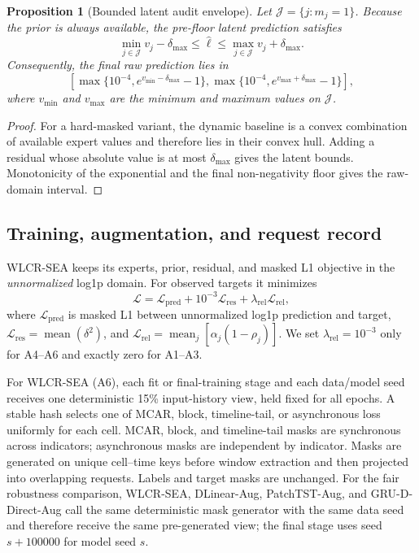 \documentclass[10pt,conference,letterpaper]{IEEEtran}
\newtheorem{proposition}{Proposition}
\newcommand{\method}{WLCR-SEA}
\begin{document}
\begin{proposition}[Bounded latent audit envelope]
Let $\mathcal J=\{j:m_j=1\}$. Because the prior is always available, the pre-floor latent prediction satisfies
\begin{equation}
\min_{j\in\mathcal J}v_j-\delta_{\max}
\leq \widehat\ell \leq
\max_{j\in\mathcal J}v_j+\delta_{\max}.
\end{equation}
Consequently, the final raw prediction lies in
\begin{equation}
\left[\max\{10^{-4},e^{v_{\min}-\delta_{\max}}-1\},
\max\{10^{-4},e^{v_{\max}+\delta_{\max}}-1\}\right],
\end{equation}
where $v_{\min}$ and $v_{\max}$ are the minimum and maximum values on $\mathcal J$.
\end{proposition}
\begin{proof}
For a hard-masked variant, the dynamic baseline is a convex combination of available expert values and therefore lies in their convex hull. Adding a residual whose absolute value is at most $\delta_{\max}$ gives the latent bounds. Monotonicity of the exponential and the final non-negativity floor gives the raw-domain interval.
\end{proof}

\subsection{Training, augmentation, and request record}
WLCR-SEA keeps its experts, prior, residual, and masked L1 objective in the \emph{unnormalized} log1p domain. For observed targets it minimizes
\begin{equation}
\mathcal L=\mathcal L_{\mathrm{pred}}
+10^{-3}\mathcal L_{\mathrm{res}}
+\lambda_{\mathrm{rel}}\mathcal L_{\mathrm{rel}},
\end{equation}
where $\mathcal L_{\mathrm{pred}}$ is masked L1 between unnormalized log1p prediction and target, $\mathcal L_{\mathrm{res}}=\operatorname{mean}(\delta^2)$, and $\mathcal L_{\mathrm{rel}}=\operatorname{mean}_j[\alpha_j(1-\rho_j)]$. We set $\lambda_{\mathrm{rel}}=10^{-3}$ only for A4--A6 and exactly zero for A1--A3.

For \method{} (A6), each fit or final-training stage and each data/model seed receives one deterministic 15\% input-history view, held fixed for all epochs. A stable hash selects one of MCAR, block, timeline-tail, or asynchronous loss uniformly for each cell. MCAR, block, and timeline-tail masks are synchronous across indicators; asynchronous masks are independent by indicator. Masks are generated on unique cell--time keys before window extraction and then projected into overlapping requests. Labels and target masks are unchanged. For the fair robustness comparison, \method{}, DLinear-Aug, PatchTST-Aug, and GRU-D-Direct-Aug call the same deterministic mask generator with the same data seed and therefore receive the same pre-generated view; the final stage uses seed $s+100000$ for model seed $s$.
\end{document}
